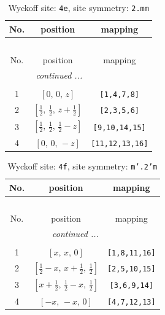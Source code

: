 \documentclass[fleqn,8pt]{jsarticle}
\begin{document}
\renewcommand{\arraystretch}{1.2}
\begin{longtable}{ccc}
\caption{Wyckoff site: {\tt 4e}, site symmetry: {\tt 2.mm}}
 \\
 \hline \hline
No. & position & mapping \\ \hline \endfirsthead

\multicolumn{2}{l}{\tablename\ \thetable{}} \\
 \hline \hline
No. & position & mapping \\ \hline \endhead

 \hline \hline
\multicolumn{2}{r}{\footnotesize\it continued ...} \\ \endfoot

 \hline \hline
\multicolumn{2}{r}{} \\ \endlastfoot

1 & $\left[ 0,\, 0,\, z \right]$ & {\tt [1,4,7,8]} \\ \hline
2 & $\left[ \frac{1}{2},\, \frac{1}{2},\, z + \frac{1}{2} \right]$ & {\tt [2,3,5,6]} \\ \hline
3 & $\left[ \frac{1}{2},\, \frac{1}{2},\, \frac{1}{2} - z \right]$ & {\tt [9,10,14,15]} \\ \hline
4 & $\left[ 0,\, 0,\, - z \right]$ & {\tt [11,12,13,16]} \\
\end{longtable}
\renewcommand{\arraystretch}{1.2}
\begin{longtable}{ccc}
\caption{Wyckoff site: {\tt 4f}, site symmetry: {\tt m'.2'm}}
 \\
 \hline \hline
No. & position & mapping \\ \hline \endfirsthead

\multicolumn{2}{l}{\tablename\ \thetable{}} \\
 \hline \hline
No. & position & mapping \\ \hline \endhead

 \hline \hline
\multicolumn{2}{r}{\footnotesize\it continued ...} \\ \endfoot

 \hline \hline
\multicolumn{2}{r}{} \\ \endlastfoot

1 & $\left[ x,\, x,\, 0 \right]$ & {\tt [1,8,11,16]} \\ \hline
2 & $\left[ \frac{1}{2} - x,\, x + \frac{1}{2},\, \frac{1}{2} \right]$ & {\tt [2,5,10,15]} \\ \hline
3 & $\left[ x + \frac{1}{2},\, \frac{1}{2} - x,\, \frac{1}{2} \right]$ & {\tt [3,6,9,14]} \\ \hline
4 & $\left[ - x,\, - x,\, 0 \right]$ & {\tt [4,7,12,13]} \\
\end{longtable}
\end{document}

